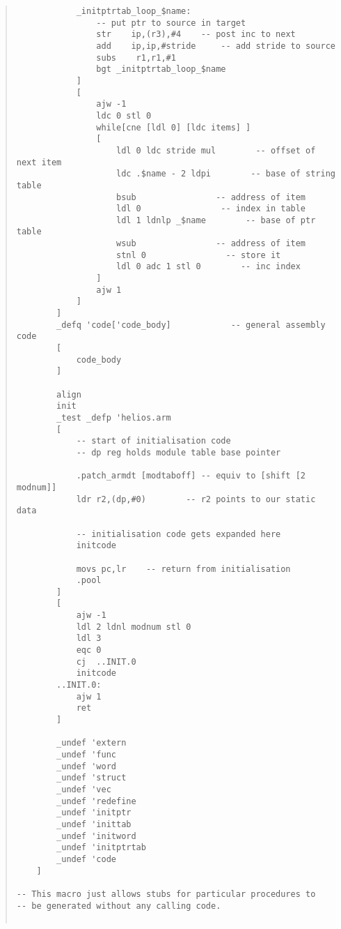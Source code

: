 \begin {quote}
\begin{verbatim}
            _initptrtab_loop_$name:
                -- put ptr to source in target
                str    ip,(r3),#4    -- post inc to next
                add    ip,ip,#stride     -- add stride to source
                subs    r1,r1,#1
                bgt _initptrtab_loop_$name
            ]
            [
                ajw -1
                ldc 0 stl 0
                while[cne [ldl 0] [ldc items] ]
                [
                    ldl 0 ldc stride mul        -- offset of next item
                    ldc .$name - 2 ldpi        -- base of string table
                    bsub                -- address of item
                    ldl 0                -- index in table
                    ldl 1 ldnlp _$name        -- base of ptr table
                    wsub                -- address of item
                    stnl 0                -- store it
                    ldl 0 adc 1 stl 0        -- inc index
                ]
                ajw 1
            ]
        ]
        _defq 'code['code_body]            -- general assembly code
        [
            code_body
        ]

        align
        init
        _test _defp 'helios.arm
        [
            -- start of initialisation code
            -- dp reg holds module table base pointer

            .patch_armdt [modtaboff] -- equiv to [shift [2 modnum]]
            ldr r2,(dp,#0)        -- r2 points to our static data

            -- initialisation code gets expanded here
            initcode

            movs pc,lr    -- return from initialisation
            .pool
        ]
        [
            ajw -1
            ldl 2 ldnl modnum stl 0
            ldl 3
            eqc 0
            cj  ..INIT.0
            initcode
        ..INIT.0:
            ajw 1
            ret
        ]

        _undef 'extern
        _undef 'func
        _undef 'word
        _undef 'struct
        _undef 'vec
        _undef 'redefine
        _undef 'initptr
        _undef 'inittab
        _undef 'initword
        _undef 'initptrtab
        _undef 'code
    ]

-- This macro just allows stubs for particular procedures to
-- be generated without any calling code.


\end{verbatim}
\end{quote}
